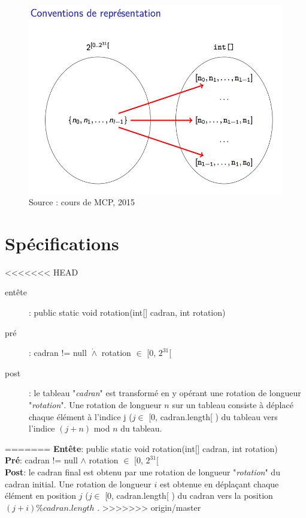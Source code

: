 \documentclass[a4paper, 12pt]{article}
\begin{document}
\begin{figure}[h]
   \includegraphics[scale=0.5]{Conventions.png}
   \caption{Source : cours de MCP, 2015}
\end{figure}

\section{Spécifications}

<<<<<<< HEAD
\begin{description}
\item[entête]: public static void rotation(int[] cadran, int rotation)
\item[pré]: cadran != null  $\dot{\wedge}$ rotation $\in$ [0, $2^{31}$[
\item[post]: le tableau "\textit{cadran}" est transformé en y opérant une rotation de longueur "\textit{rotation}". Une rotation de longueur $n$ sur un tableau consiste à déplacé chaque élément à l'indice j ($j \in$ [0, cadran.length[ ) du tableau vers l'indice $(j+n)$ mod $n$ du tableau.
\end{description}
=======
\textbf{Entête}: public static void rotation(int[] cadran, int rotation)\\

\textbf{Pré}: cadran != null $\wedge$ rotation $\in$ [0, $2^{31}$[\\

\textbf{Post}: le cadran final est obtenu par une rotation de longueur "\textit{rotation}" du cadran initial. Une rotation de longueur $i$ est obtenue en déplaçant chaque élément en position $j$ ($j \in$ [0, cadran.length[ ) du cadran vers la position $(j+i)\%cadran.length$ .
>>>>>>> origin/master
\end{document}
